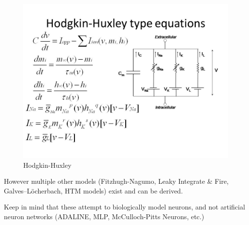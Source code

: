 \documentclass[main]{subfiles}
\begin{document}
\begin{figure}[H]
	\centering
	\includegraphics[width=0.9\linewidth]{09_WhySpikes/figures/Hodgkin-Huxley+type+equations.jpg}
	\caption{Hodgkin-Huxley}
\end{figure}

However multiple other models (Fitzhugh-Nagumo, Leaky Integrate \& Fire, Galves–Löcherbach, HTM models) exist and can be derived.

Keep in mind that these attempt to biologically model neurons, and not artificial neuron networks (ADALINE, MLP, McCulloch-Pitts Neurons, etc.)
\end{document}
